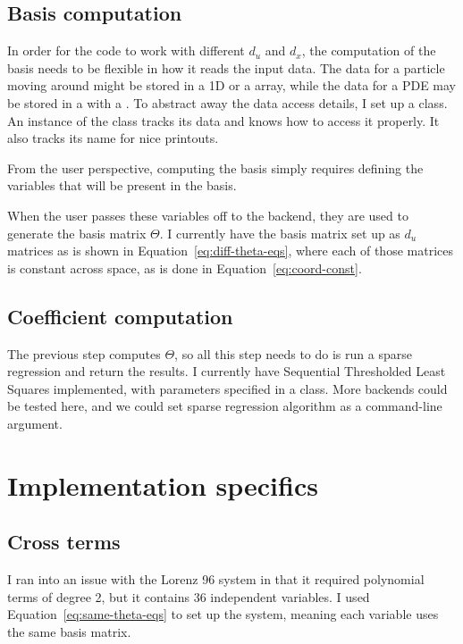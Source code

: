\documentclass{article}
\def\lstinline#1{}%
\begin{document}
\subsection{Basis computation}

In order for the code to work with different $d_u$ and $d_x$, the computation of
the basis needs to be flexible in how it reads the input data. The data
for a particle moving around might be stored in a 1D \lstinline{Vec} or a
\lstinline{PetscScalar} array, while the data for a PDE may be stored in a
\lstinline{Vec} with a \lstinline{DMDA}. To abstract away the data access
details, I set up a \lstinline{Variable} class. An instance of the class tracks
its data and knows how to access it properly. It also tracks its name for nice
printouts.

From the user perspective, computing the basis simply requires defining the variables
that will be present in the basis.

When the user passes these variables off to the backend, they are used to
generate the basis matrix $\Theta$.
I currently have the basis matrix set up as $d_u$ matrices as is shown in Equation~\ref{eq:diff-theta-eqs}, where
each of those matrices is constant across space, as is done in Equation~\ref{eq:coord-const}.


\subsection{Coefficient computation}

The previous step computes $\Theta$, so all this step needs to do is run a
sparse regression and return the results. I currently have Sequential
Thresholded Least Squares implemented, with parameters specified in a
\lstinline{SparseReg} class. More backends could be tested here, and we could
set sparse regression algorithm as a command-line argument.

\section{Implementation specifics}

\subsection{Cross terms}
I ran into an issue with the Lorenz 96 system in that it required polynomial
terms of degree 2, but it contains 36 independent variables. I used
Equation~\ref{eq:same-theta-eqs} to set up the system, meaning each variable
uses the same basis matrix.
\end{document}
